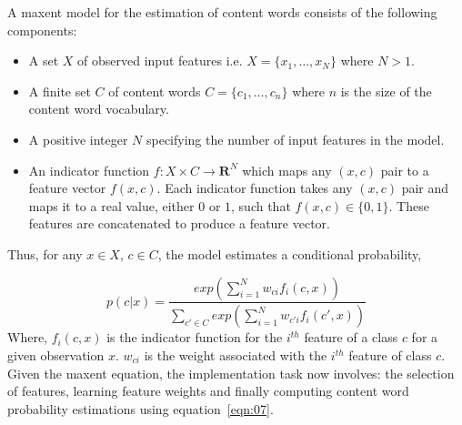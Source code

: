\begin{definition}A maxent model for the estimation of content words consists of the following components:
\begin{itemize}
\item
A set $X$ of observed input features i.e. $X = \{x_1, \ldots ,x_N\}$ where $N > 1$. 
\item
A finite set $C$ of content words $C = \{c_1, \ldots ,c_n\}$ where $n$ is the size of the content word vocabulary.
\item
A positive integer $N$ specifying the number of input features in the model.
\item
An indicator function $ f: X \times C \rightarrow \textbf{R}^{N}$ which maps any $(x,c)$ pair to a feature vector $f(x,c)$. Each indicator function takes any $(x,c)$ pair and maps it to a real value, either $0$ or $1$, such that $f(x,c)\in \{0,1\}$. These features are concatenated to produce a feature vector.
\end{itemize}

\end{definition}
Thus, for any $x \in X$, $c \in C$, the model estimates a conditional probability,

\begin{equation}
\label{eqn:07}
p(c|x)=\frac{exp(\sum_{i=1}^{N}w_{ci}f_i(c,x))}{\sum_{c' \in C}exp(\sum_{i=1}^{N}w_{c'i}f_i(c',x))}
\end{equation}
Where,  $f_i(c,x)$ is the indicator function for the $i^{th}$ feature of a class $c$ for a given observation $x$. $w_{ci}$ is the weight associated with the $i^{th}$ feature of class $c$. Given the maxent equation, the implementation task now involves: the selection of features, learning feature weights and finally computing content word probability estimations using equation~\ref{eqn:07}. 




